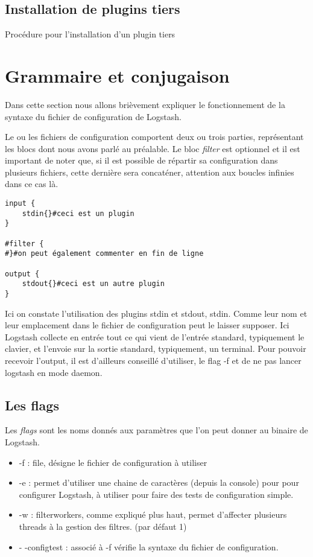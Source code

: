 \subsection{Installation de plugins tiers}
Procédure pour l'installation d'un plugin tiers



\section{Grammaire et conjugaison}
Dans cette section nous allons brièvement expliquer le fonctionnement de la syntaxe 
du fichier de configuration de Logstash.

Le ou les fichiers de configuration comportent deux ou trois parties, représentant 
les blocs dont nous avons parlé au préalable. Le bloc \emph{filter} est optionnel
et il est important de noter que, si il est possible de répartir sa configuration
dans plusieurs fichiers, cette dernière sera concaténer, attention aux boucles infinies
dans ce cas là.

\begin{lstlisting}[style=logstash,label={lst:conflogstashminimale},caption={Configuration minimale}]
input {
    stdin{}#ceci est un plugin
}

#filter {
#}#on peut également commenter en fin de ligne

output {
    stdout{}#ceci est un autre plugin
}
\end{lstlisting}

Ici on constate l'utilisation des plugins stdin et stdout, stdin. Comme leur nom 
et leur emplacement dans le fichier de configuration peut le laisser supposer.
Ici Logstash collecte en entrée tout ce qui vient de l'entrée standard, typiquement
le clavier, et l'envoie sur la sortie standard, typiquement, un terminal.
Pour pouvoir recevoir l'output, il est d'ailleurs conseillé d'utiliser, le flag -f
et de ne pas lancer logstash en mode daemon.

\subsection{Les flags}
Les \emph{flags} sont les noms donnés aux paramètres que l'on peut donner au binaire
de Logstash.

\begin{itemize}
    \item -f : file, désigne le fichier de configuration à utiliser
    \item -e : permet d'utiliser une chaine de caractères (depuis la console) pour
    pour configurer Logstash, à utiliser pour faire des tests de configuration simple.
    \item -w : filterworkers, comme expliqué plus haut, permet d'affecter plusieurs
    threads à la gestion des filtres. (par défaut 1)
    \item - -configtest : associé à -f  vérifie la syntaxe 
    du fichier de configuration.
\end{itemize}

